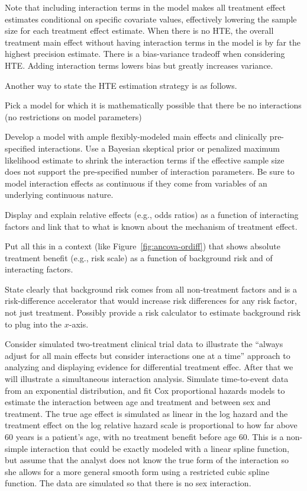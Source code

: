Note that including interaction terms in the model makes all treatment
effect estimates conditional on specific covariate values, effectively
lowering the sample size for each treatment effect estimate.  When
there is no HTE, the overall treatment main effect without having interaction
terms in the model is by far the highest precision estimate.  There is
a bias-variance tradeoff when considering HTE.  Adding interaction
terms lowers bias but greatly increases variance.

Another way to state the HTE estimation strategy is as follows.
\be
\item Pick a model for which it is mathematically possible that there be no interactions (no restrictions on model parameters)
\item Develop a model with ample flexibly-modeled main effects and clinically pre-specified interactions.  Use a Bayesian skeptical prior or penalized maximum likelihood estimate to shrink the interaction terms if the effective sample size does not support the pre-specified number of interaction parameters.  Be sure to model interaction effects as continuous if they come from variables of an underlying continuous nature.
\item Display and explain relative effects (e.g., odds ratios) as a function of interacting factors and link that to what is known about the mechanism of treatment effect.
\item Put all this in a context (like Figure~\ref{fig:ancova-ordiff}) that shows absolute treatment benefit (e.g., risk scale) as a function of background risk and of interacting factors.
\item State clearly that background risk comes from all non-treatment factors and is a risk-difference accelerator that would increase risk differences for any risk factor, not just treatment.  Possibly provide a risk calculator to estimate background risk to plug into the $x$-axis.
\ee

Consider simulated two-treatment clinical trial data to illustrate the ``always adjust for all main effects but consider interactions one at a time'' approach to analyzing and displaying evidence for differential treatment effec.  After that we will illustrate a simultaneous interaction analysis.  Simulate time-to-event data from an exponential distribution, and fit Cox proportional hazards models to estimate the interaction between age and treatment and between sex and treatment.  The true age effect is simulated as linear in the log hazard and the treatment effect on the log relative hazard scale is proportional to how far above 60 years is a patient's age, with no treatment benefit before age 60.  This is a non-simple interaction that could be exactly modeled with a linear spline function, but assume that the analyst does not know the true form of the interaction so she allows for a more general smooth form using a restricted cubic spline function.  The data are simulated so that there is no sex interaction.

